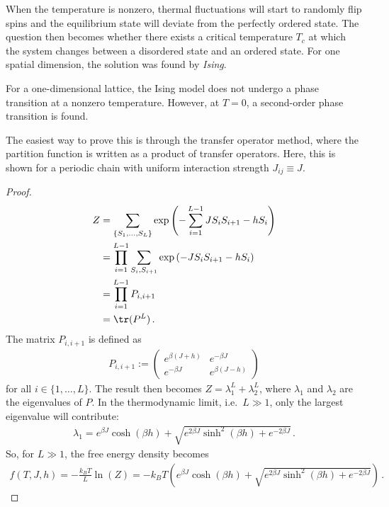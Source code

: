     When the temperature is nonzero, thermal fluctuations will start to randomly flip spins and the equilibrium state will deviate from the perfectly ordered state. The question then becomes whether there exists a critical temperature $T_c$ at which the system changes between a disordered state and an ordered state. For one spatial dimension, the solution was found by \textit{Ising}.
    \begin{property}[$d=1$]
        For a one-dimensional lattice, the Ising model does not undergo a phase transition at a nonzero temperature. However, at $T=0$, a second-order phase transition is found.

        The easiest way to prove this is through the transfer operator method, where the partition function is written as a product of transfer operators. Here, this is shown for a periodic chain with uniform interaction strength $J_{ij}\equiv J$.
        \begin{proof}
            \begin{align*}
                Z &= \sum_{\{S_1,\ldots,S_L\}}\exp\left(-\sum_{i=1}^{L-1}JS_iS_{i+1}-hS_i\right)\\
                &= \prod_{i=1}^{L-1}\sum_{S_i,S_{i+1}}\exp\left(-JS_iS_{i+1}-hS_i\right)\\
                &= \prod_{i=1}^{L-1}P_{i,i+1}\\
                &= \tr(P^L)\,.
            \end{align*}
            The matrix $P_{i,i+1}$ is defined as
            \begin{gather*}
                P_{i,i+1} :=
                \begin{pmatrix}
                    e^{\beta(J+h)}&e^{-\beta J}\\
                    e^{-\beta J}&e^{\beta(J-h)}
                \end{pmatrix}
            \end{gather*}
            for all $i\in\{1,\ldots,L\}$. The result then becomes $Z=\lambda^L_1+\lambda^L_2$, where $\lambda_1$ and $\lambda_2$ are the eigenvalues of $P$. In the thermodynamic limit, i.e.~$L\gg1$, only the largest eigenvalue will contribute:
            \begin{gather*}
                \lambda_1 = e^{\beta J}\cosh(\beta h) + \sqrt{e^{2\beta J}\sinh^2(\beta h)+e^{-2\beta J}}\,.
            \end{gather*}
            So, for $L\gg1$, the free energy density becomes
            \begin{gather*}
                f(T,J,h) = -\frac{k_BT}{L}\ln(Z) = -k_BT\left(e^{\beta J}\cosh(\beta h) + \sqrt{e^{2\beta J}\sinh^2(\beta h)+e^{-2\beta J}}\right)\,.
            \end{gather*}
    
        \end{proof}
    \end{property}

